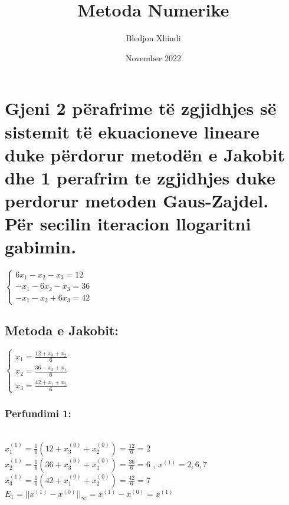 \documentclass{article}
\title{Metoda Numerike}
\author{Bledjon Xhindi}
\date{November 2022}
\begin{document}
\maketitle

\section*{Gjeni 2 përafrime të zgjidhjes së sistemit të ekuacioneve lineare duke përdorur metodën e Jakobit
dhe 1 perafrim te zgjidhjes duke perdorur metoden Gaus-Zajdel. Për secilin iteracion llogaritni
gabimin.}

\begin{center}
    $\begin{cases} 6x_1 - x_2 - x_3 = 12\\ -x_1 - 6x_2 - x_3 = 36 \\ -x_1 - x_2 + 6x_3 = 42\end{cases}$

\end{center}


\subsection{Metoda e Jakobit:}

\begin{center}
    $\begin{cases} x_1 = \frac{12 + x_3 + x_2}{6}\\ x_2 = \frac{36 - x_3 + x_1}{6} \\ x_3 = \frac{42 + x_1 + x_2}{6}\end{cases}$\\

\end{center}

\subsubsection{Perfundimi 1:}\\
$x_1^{(1)} = \frac{1}{6} (12 + x_3^{(0)} + x_2^{(0)} )= \frac{12}{6} =2$\\

$x_2^{(1)} = \frac{1}{6} (36 + x_3^{(0)} + x_1^{(0)} )= \frac{36}{6} =6$  , $x^{(1)}= 2 , 6 ,7$\\


$x_3^{(1)} = \frac{1}{6} (42+ x_1^{(0)} + x_2^{(0)}) = \frac{42}{6} =7$\\

$E_1=||x^{(1)} - x^{(0)} ||_{\infty} =x^{(1)} - x^{(0)} =  x^{(1)} $\\
\end{document}
